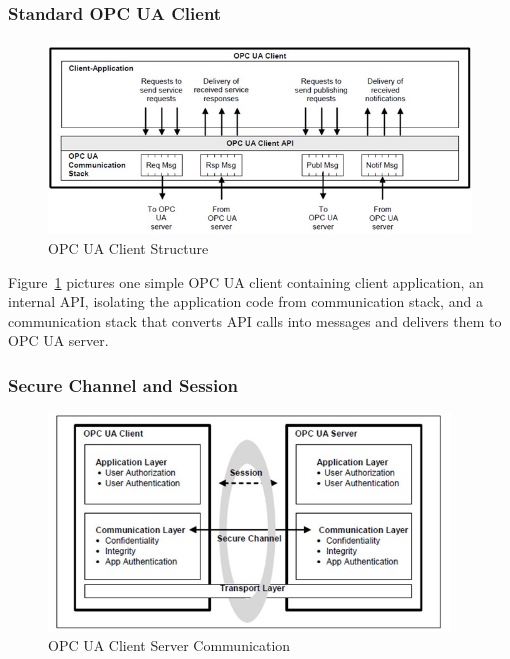 \documentclass[]{llncs}
\begin{document}
\subsubsection{Standard OPC UA Client}
\begin{figure}[t]
	\centering
	\includegraphics[width=1.1\textwidth]{client.jpg}
		\caption[ ]{OPC UA Client Structure\cite{O1}}
	\label{fig:client}
\end{figure}

Figure~\ref{fig:client} pictures one simple OPC UA client containing client application, an internal API, isolating the application code from communication stack, and a communication stack that converts API calls into messages and delivers them to OPC UA server.

\subsubsection{Secure Channel and Session}

\begin{figure}[h]
	\centering
	\includegraphics[width=0.95\textwidth]{opc_ua_cs_comm.jpg}
		\caption[ ]{OPC UA Client Server Communication\cite{O2}}
	\label{fig:opc_ua_cs_comm}
\end{figure}
\end{document}
